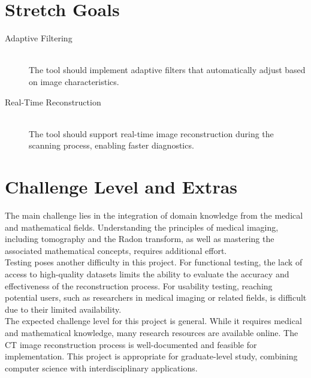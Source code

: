\documentclass{article}
\begin{document}
\section{Stretch Goals}
\begin{description}
\item[Adaptive Filtering] \hfill \\ The tool should implement adaptive
  filters that automatically adjust based on image characteristics.
\item[Real-Time Reconstruction] \hfill \\ The tool should support real-time
  image reconstruction during the scanning process, enabling faster diagnostics.
\end{description}

\section{Challenge Level and Extras}
The main challenge lies in the integration of domain knowledge from the medical
and mathematical fields. Understanding the principles of medical imaging,
including tomography and the Radon transform, as well as mastering the
associated mathematical concepts, requires additional effort.\\
Testing poses another difficulty in this project. For functional testing, the
lack of access to high-quality datasets limits the ability to evaluate the
accuracy and effectiveness of the reconstruction process. For usability testing,
reaching potential users, such as researchers in medical imaging or related
fields, is difficult due to their limited availability.\\
The expected challenge level for this project is general. While it requires
medical and mathematical knowledge, many research resources are available
online. The CT image reconstruction process is well-documented and feasible for
implementation. This project is appropriate for graduate-level study, combining
computer science with interdisciplinary applications.\\

\newpage
\printbibliography
\end{document}
